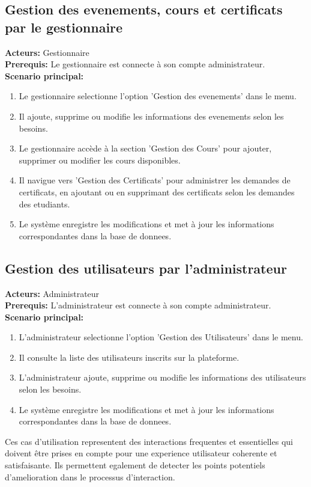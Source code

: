 \documentclass[a4paper, 11pt, openany]{report}
\begin{document}
\subsection{Gestion des evenements, cours et certificats par le gestionnaire}
\textbf{Acteurs:} Gestionnaire \\
\textbf{Prerequis:} Le gestionnaire est connecte à son compte administrateur. \\
\textbf{Scenario principal:}
\begin{enumerate}
    \item Le gestionnaire selectionne l'option 'Gestion des evenements' dans le menu.
    \item Il ajoute, supprime ou modifie les informations des evenements selon les besoins.
    \item Le gestionnaire accède à la section 'Gestion des Cours' pour ajouter, supprimer ou modifier les cours disponibles.
    \item Il navigue vers 'Gestion des Certificats' pour administrer les demandes de certificats, en ajoutant ou en supprimant des certificats selon les demandes des etudiants.
    \item Le système enregistre les modifications et met à jour les informations correspondantes dans la base de donnees.
\end{enumerate}

\subsection{Gestion des utilisateurs par l'administrateur}
\textbf{Acteurs:} Administrateur \\
\textbf{Prerequis:} L'administrateur est connecte à son compte administrateur. \\
\textbf{Scenario principal:}
\begin{enumerate}
    \item L'administrateur selectionne l'option 'Gestion des Utilisateurs' dans le menu.
    \item Il consulte la liste des utilisateurs inscrits sur la plateforme.
    \item L'administrateur ajoute, supprime ou modifie les informations des utilisateurs selon les besoins.
    \item Le système enregistre les modifications et met à jour les informations correspondantes dans la base de donnees.
\end{enumerate}

Ces cas d'utilisation representent des interactions frequentes et essentielles qui doivent être prises en compte pour une experience utilisateur coherente et satisfaisante. Ils permettent egalement de detecter les points potentiels d'amelioration dans le processus d'interaction.
\end{document}
